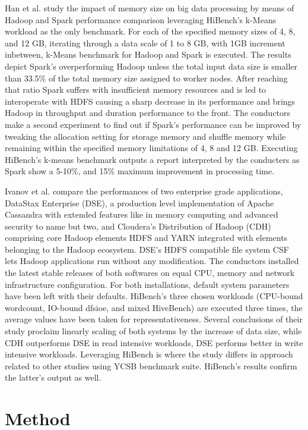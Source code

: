 \documentclass[review]{elsarticle}
\begin{document}
Han et al. \cite{han_impact_2017} study the impact of memory size on big data processing by means of Hadoop and Spark performance comparison leveraging HiBench’s k-Means workload as the only benchmark. For each of the specified memory sizes of 4, 8, and 12 GB, iterating through a data scale of 1 to 8 GB, with 1GB increment inbetween, k-Means benchmark for Hadoop and Spark is executed. The results depict Spark’s overperforming Hadoop unless the total input data size is smaller than 33.5\% of the total memory size assigned to worker nodes. After reaching that ratio Spark suffers with insufficient memory resources and is led to interoperate with HDFS causing a sharp decrease in its performance and brings Hadoop in throughput and duration performance to the front. The conductors make a second experiment to find out if Spark’s performance can be improved by tweaking the allocation setting for storage memory and shuffle memory while remaining within the specified memory limitations of 4, 8 and 12 GB. Executing HiBench’s k-means benchmark outputs a report interpreted by the conducters as Spark show a 5-10\%, and 15\% maximum improvement in processing time.

Ivanov et al. \cite{ivanov_performance_2015} compare the performances of two enterprise grade applications, DataStax Enterprise (DSE), a production level implementation of Apache Cassandra with extended features like in memory computing and advanced security to name but two, and Cloudera’s Distribution of Hadoop (CDH) comprising core Hadoop elements HDFS and YARN integrated with elements belonging to the Hadoop ecosystem. DSE’s HDFS compatible file system CSF lets Hadoop applications run without any modification. The conductors installed the latest stable releases of both softwares on equal CPU, memory and network infrastructure configuration. For both installations, default system parameters have been left with their defaults. HiBench’s three chosen workloads (CPU-bound wordcount, IO-bound dfsioe, and mixed HiveBench) are executed three times, the average values have been taken for representativeness. Several conclusions of their study proclaim linearly scaling of both systems by the increase of data size, while CDH outperforms DSE in read intensive workloads, DSE performs better in write intensive workloads. Leveraging HiBench is where the study differs in approach related to other studies using YCSB benchmark suite. HiBench’s results confirm the latter’s output as well.




\section{Method}
\end{document}
